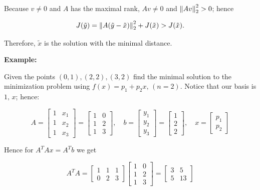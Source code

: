 Because \(v \ne 0\) and \(A\) has the maximal rank, \(Av \ne 0\) and \(\left\| Av \right\|_2^2 > 0\); hence 

\[
    J(\tilde{y}) = \left\| A(\tilde{y} - \tilde{x}) \right\|_2^2 + J(\tilde{x}) > J(\tilde{x}).
\]

Therefore, \(\tilde{x}\) is the solution with the minimal distance.

\QED

\textbf{Example:}

Given the points \((0, 1), (2, 2), (3, 2)\) find the minimal solution to the minimization problem using \(f(x) = p_1 + p_2 x, \,(n = 2)\).
Notice that our basis is \(1, \, x\); hence:

\[
        A = 
        \begin{bmatrix}
            1 & x_1 \\ 
            1 & x_2 \\ 
            1 & x_3
        \end{bmatrix}
        = 
        \begin{bmatrix}
            1 & 0 \\ 
            1 & 2 \\ 
            1 & 3
        \end{bmatrix},
        \quad 
        b = 
        \begin{bmatrix}
            y_1 \\ 
            y_2 \\ 
            y_3
        \end{bmatrix}
        =
        \begin{bmatrix}
            1 \\ 
            2 \\ 
            2
        \end{bmatrix}, 
        \quad 
        x = 
        \begin{bmatrix}
            p_1 \\ 
            p_2
        \end{bmatrix}
\]

Hence for \(A^T A x = A^T b\) we get 

\[
        A^TA = 
        \begin{bmatrix}
            1 & 1 & 1 \\ 
            0 & 2 & 3
        \end{bmatrix}
        \begin{bmatrix}
            1 & 0 \\ 
            1 & 2 \\ 
            1 & 3
        \end{bmatrix}
        =  
        \begin{bmatrix}
            3 & 5 \\ 
            5 & 13
        \end{bmatrix}
\]

